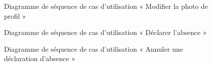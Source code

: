 \begin{figure}[H]
  \centering
  \caption{Diagramme de séquence de cas d'utilisation « Modifier la photo de profil »}
  \label{fig:sequence_edit_profil_avatar}
\end{figure}

\begin{figure}[H]
  \centering
  \caption{Diagramme de séquence de cas d'utilisation « Déclarer l'absence »}
  \label{fig:sequence_declare_absence}
\end{figure}

\begin{figure}[H]
  \centering
  \caption{Diagramme de séquence de cas d'utilisation « Annuler une déclaration d'absence »}
  \label{fig:sequence_annuler_absence}
\end{figure}

